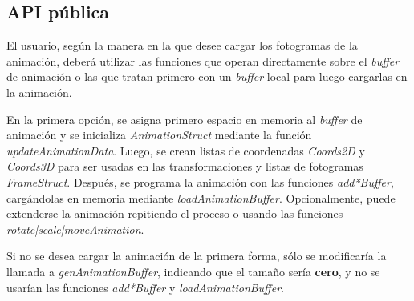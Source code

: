 



\FloatBarrier
\subsection{API pública}
El usuario, según la manera en la que desee cargar los fotogramas de la animación, deberá utilizar las funciones que operan directamente sobre el \textit{buffer} de animación o las que tratan primero con un \textit{buffer} local para luego cargarlas en la animación.

En la primera opción, se asigna primero espacio en memoria al \textit{buffer} de animación y se inicializa \textit{AnimationStruct} mediante la función \textit{updateAnimationData}. Luego, se crean listas de coordenadas \textit{Coords2D} y \textit{Coords3D} para ser usadas en las transformaciones y listas de fotogramas \textit{FrameStruct}. Después, se programa la animación con las funciones \textit{add*Buffer}, cargándolas en memoria mediante \textit{loadAnimationBuffer}. Opcionalmente, puede extenderse la animación repitiendo el proceso o usando las funciones \textit{rotate|scale|moveAnimation}.

Si no se desea cargar la animación de la primera forma, sólo se modificaría la llamada a \textit{genAnimationBuffer}, indicando que el tamaño sería \textbf{cero}, y no se usarían las funciones \textit{add*Buffer} y \textit{loadAnimationBuffer}.

